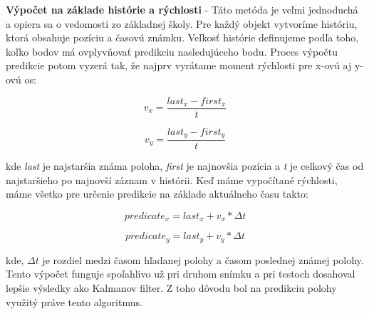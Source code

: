 \textbf{Výpočet na základe histórie a rýchlosti} - Táto metóda je veľmi jednoduchá a opiera sa o vedomosti zo základnej školy. Pre každý objekt vytvoríme históriu, ktorá obsahuje pozíciu a časovú známku. Veľkosť histórie definujeme podľa toho, koľko bodov má ovplyvňovať predikciu nasledujúceho bodu. Proces výpočtu predikcie potom vyzerá tak, že najprv vyrátame moment rýchlosti pre x-ovú aj y-ovú os: 

\begin{figure}[H]
    \centering
    \begin{minipage}[b]{0.45\textwidth}
        \begin{equation}
            v_x = \frac{last_x - first_x} {t}
        \end{equation}
    \end{minipage}
    \hfill
    \begin{minipage}[b]{0.4\textwidth}
        \begin{equation}
            v_y = \frac{last_y - first_y} {t}
        \end{equation}
    \end{minipage}
\end{figure}

kde \textit{last} je najstaršia známa poloha, \textit{first} je najnovšia pozícia a \textit{t} je celkový čas od najstaršieho po najnovší záznam v histórii. Keď máme vypočítané rýchlosti, máme všetko pre určenie predikcie na základe aktuálneho času takto: 

\begin{figure}[H]
    \centering
    \begin{minipage}[b]{0.45\textwidth}
        \begin{equation}
            predicate_x = last_x + v_x * \Delta t
        \end{equation}
    \end{minipage}
    \hfill
    \begin{minipage}[b]{0.4\textwidth}
        \begin{equation}
            predicate_y = last_y + v_y * \Delta t
        \end{equation}
    \end{minipage}
\end{figure}

kde, $\Delta t$ je rozdiel medzi časom hľadanej polohy a časom poslednej známej polohy. Tento výpočet funguje spoľahlivo už pri druhom snímku a pri testoch dosahoval lepšie výsledky ako Kalmanov filter. Z toho dôvodu bol na predikciu polohy využitý práve tento algoritmus. 

